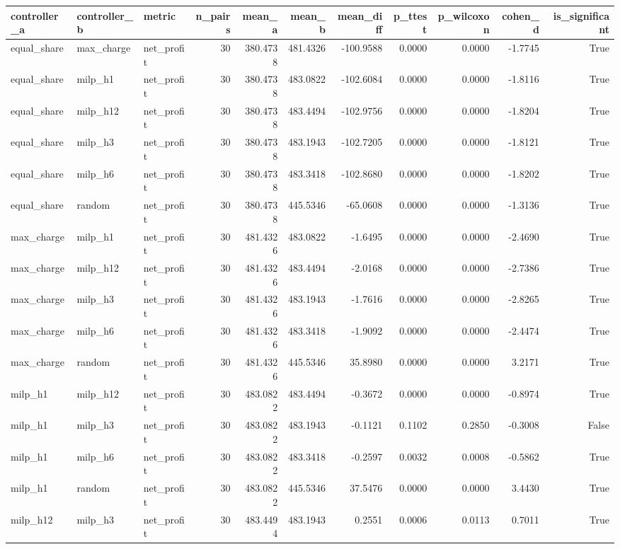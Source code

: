 \begin{tabular}{lllrrrrrrrr}
\toprule
controller_a & controller_b & metric & n_pairs & mean_a & mean_b & mean_diff & p_ttest & p_wilcoxon & cohen_d & is_significant \\
\midrule
equal_share & max_charge & net_profit & 30 & 380.4738 & 481.4326 & -100.9588 & 0.0000 & 0.0000 & -1.7745 & True \\
equal_share & milp_h1 & net_profit & 30 & 380.4738 & 483.0822 & -102.6084 & 0.0000 & 0.0000 & -1.8116 & True \\
equal_share & milp_h12 & net_profit & 30 & 380.4738 & 483.4494 & -102.9756 & 0.0000 & 0.0000 & -1.8204 & True \\
equal_share & milp_h3 & net_profit & 30 & 380.4738 & 483.1943 & -102.7205 & 0.0000 & 0.0000 & -1.8121 & True \\
equal_share & milp_h6 & net_profit & 30 & 380.4738 & 483.3418 & -102.8680 & 0.0000 & 0.0000 & -1.8202 & True \\
equal_share & random & net_profit & 30 & 380.4738 & 445.5346 & -65.0608 & 0.0000 & 0.0000 & -1.3136 & True \\
max_charge & milp_h1 & net_profit & 30 & 481.4326 & 483.0822 & -1.6495 & 0.0000 & 0.0000 & -2.4690 & True \\
max_charge & milp_h12 & net_profit & 30 & 481.4326 & 483.4494 & -2.0168 & 0.0000 & 0.0000 & -2.7386 & True \\
max_charge & milp_h3 & net_profit & 30 & 481.4326 & 483.1943 & -1.7616 & 0.0000 & 0.0000 & -2.8265 & True \\
max_charge & milp_h6 & net_profit & 30 & 481.4326 & 483.3418 & -1.9092 & 0.0000 & 0.0000 & -2.4474 & True \\
max_charge & random & net_profit & 30 & 481.4326 & 445.5346 & 35.8980 & 0.0000 & 0.0000 & 3.2171 & True \\
milp_h1 & milp_h12 & net_profit & 30 & 483.0822 & 483.4494 & -0.3672 & 0.0000 & 0.0000 & -0.8974 & True \\
milp_h1 & milp_h3 & net_profit & 30 & 483.0822 & 483.1943 & -0.1121 & 0.1102 & 0.2850 & -0.3008 & False \\
milp_h1 & milp_h6 & net_profit & 30 & 483.0822 & 483.3418 & -0.2597 & 0.0032 & 0.0008 & -0.5862 & True \\
milp_h1 & random & net_profit & 30 & 483.0822 & 445.5346 & 37.5476 & 0.0000 & 0.0000 & 3.4430 & True \\
milp_h12 & milp_h3 & net_profit & 30 & 483.4494 & 483.1943 & 0.2551 & 0.0006 & 0.0113 & 0.7011 & True \\

\end{tabular}
